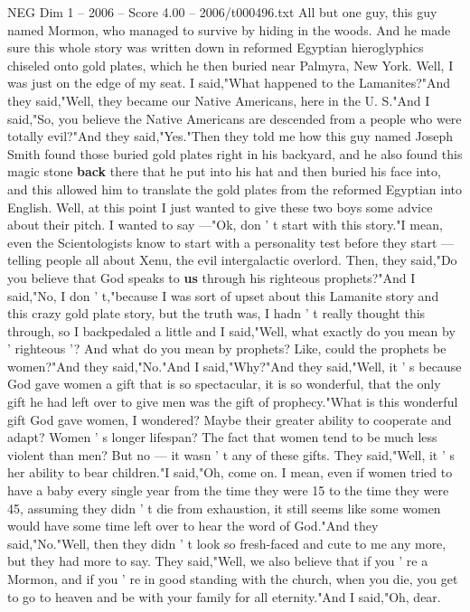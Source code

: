 \begin{textsample}{NEG Dim 1 – 2006 – Score 4.00 – 2006/t000496.txt}
All but one guy, this guy named Mormon, who managed to survive by hiding in the woods.
And he made sure this whole story was written down in reformed Egyptian hieroglyphics chiseled onto gold plates, which he then buried near Palmyra, New York.
Well, I was just on the edge of my seat.
I said,"What happened to the Lamanites?"And they said,"Well, they became our Native Americans, here in the U.
S."And I said,"So, you believe the Native Americans are descended from a people who were totally evil?"And they said,"Yes."Then they told me how this guy named Joseph Smith found those buried gold plates right in his backyard, and he also found this magic stone \textbf{back} there that he put into his hat and then buried his face into, and this allowed him to translate the gold plates from the reformed Egyptian into English.
Well, at this point I just wanted to give these two boys some advice about their pitch.
I wanted to say —"Ok, don ' t start with this story."I mean, even the Scientologists know to start with a personality test before they start — telling people all about Xenu, the evil intergalactic overlord.
Then, they said,"Do you believe that God speaks to \textbf{us} through his righteous prophets?"And I said,"No, I don ' t,"because I was sort of upset about this Lamanite story and this crazy gold plate story, but the truth was, I hadn ' t really thought this through, so I backpedaled a little and I said,"Well, what exactly do you mean by ' righteous '?
And what do you mean by prophets?
Like, could the prophets be women?"And they said,"No."And I said,"Why?"And they said,"Well, it ' s because God gave women a gift that is so spectacular, it is so wonderful, that the only gift he had left over to give men was the gift of prophecy."What is this wonderful gift God gave women, I wondered?
Maybe their greater ability to cooperate and adapt?
Women ' s longer lifespan?
The fact that women tend to be much less violent than men?
But no — it wasn ' t any of these gifts.
They said,"Well, it ' s her ability to bear children."I said,"Oh, come on.
I mean, even if women tried to have a baby every single year from the time they were 15 to the time they were 45, assuming they didn ' t die from exhaustion, it still seems like some women would have some time left over to hear the word of God."And they said,"No."Well, then they didn ' t look so fresh-faced and cute to me any more, but they had more to say.
They said,"Well, we also believe that if you ' re a Mormon, and if you ' re in good standing with the church, when you die, you get to go to heaven and be with your family for all eternity."And I said,"Oh, dear.

\end{textsample}
